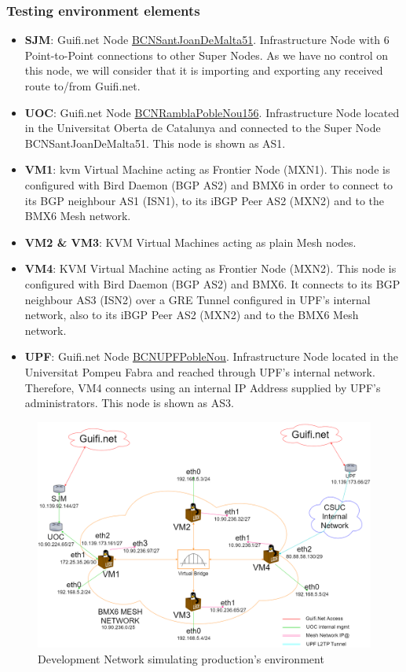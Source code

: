 \subsubsection{Testing environment elements}
\begin{itemize}
    \item \textbf{SJM}: Guifi.net Node  \href{https://guifi.net/en/node/20262/}{BCNSantJoanDeMalta51}. Infrastructure Node with 6 Point-to-Point connections to other Super Nodes. As we have no control on this node, we will consider that it is importing and exporting any received route to/from Guifi.net.
    \item \textbf{UOC}: Guifi.net Node \href{https://guifi.net/en/node/63255}{BCNRamblaPobleNou156}. Infrastructure Node located in the Universitat Oberta de Catalunya and connected to the Super Node BCNSantJoanDeMalta51. This node is shown as AS1.
    \item \textbf{VM1}: \acrshort{kvm} Virtual Machine acting as Frontier Node (MXN1). This node is configured with Bird Daemon (BGP AS2) and BMX6 in order to connect to its BGP neighbour AS1 (ISN1), to its iBGP Peer AS2 (MXN2) and to the BMX6 Mesh network.
    \item \textbf{VM2 \& VM3}: KVM Virtual Machines acting as plain Mesh nodes.
    \item \textbf{VM4}: KVM Virtual Machine acting as Frontier Node (MXN2). This node is configured with Bird Daemon (BGP AS2) and BMX6. It connects to its BGP neighbour AS3 (ISN2) over a GRE Tunnel configured in UPF's internal network, also to its iBGP Peer AS2 (MXN2) and to the BMX6 Mesh network.
    \item \textbf{UPF}: Guifi.net Node \href{https://guifi.net/en/node/56604}{BCNUPFPobleNou}. Infrastructure Node located in the Universitat Pompeu Fabra and reached through UPF's internal network. Therefore, VM4 connects using an internal IP Address supplied by UPF's administrators. This node is shown as AS3.
\end{itemize}


\begin{landscape}
\begin{figure}[ht!]
    \centering
    \includegraphics[width=\hsize]{images/devnetfull}
    \caption{Development Network simulating production's environment}
    \label{fig:devnet}
\end{figure}
\end{landscape}
\newpage

